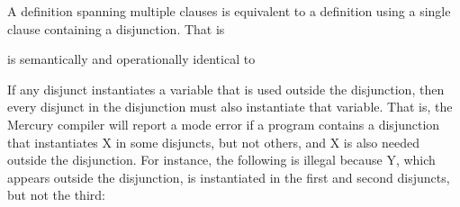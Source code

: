 \documentclass[a4paper,11pt,notitlepage,onecolumn]{book}
\begin{document}
\Note A definition spanning multiple clauses is equivalent to a
definition using a single clause containing a disjunction.  That is
\begin{small}

\begin{ptabular}
\nextline
{}
\nextline
{}
\nextline
\end{ptabular}

\end{small}
is semantically and operationally identical to
\begin{small}

\begin{ptabular}
\nextline
\end{ptabular}

\end{small}

\Note If any disjunct instantiates a variable that is used outside the
disjunction, then every disjunct in the disjunction must also instantiate
that variable.  That is, the Mercury compiler will report a mode error if a
program contains a disjunction that instantiates \textsf{X} in some disjuncts, but
not others, and \textsf{X} is also needed outside the disjunction.  For instance,
the following is illegal because \textsf{Y}, which appears outside the disjunction,
is instantiated in the first and second disjuncts, but not the third:

\begin{small}

\begin{ptabular}
\nextline
{}
\nextline
\end{ptabular}

\end{small}
\end{document}
